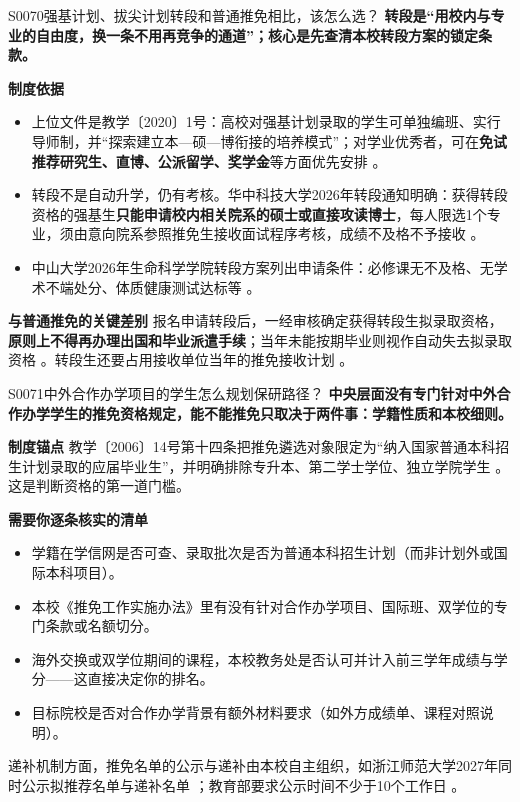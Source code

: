 \begin{qa}{S0070}{强基计划、拔尖计划转段和普通推免相比，该怎么选？}
\textbf{转段是“用校内与专业的自由度，换一条不用再竞争的通道”；核心是先查清本校转段方案的锁定条款。}

\textbf{制度依据}
\begin{itemize}
  \item 上位文件是教学〔2020〕1号：高校对强基计划录取的学生可单独编班、实行导师制，并“探索建立本—硕—博衔接的培养模式”；对学业优秀者，可在\textbf{免试推荐研究生、直博、公派留学、奖学金}等方面优先安排 。
  \item 转段不是自动升学，仍有考核。华中科技大学2026年转段通知明确：获得转段资格的强基生\textbf{只能申请校内相关院系的硕士或直接攻读博士}，每人限选1个专业，须由意向院系参照推免生接收面试程序考核，成绩不及格不予接收 。
  \item 中山大学2026年生命科学学院转段方案列出申请条件：必修课无不及格、无学术不端处分、体质健康测试达标等 。
\end{itemize}

\textbf{与普通推免的关键差别}
报名申请转段后，一经审核确定获得转段生拟录取资格，\textbf{原则上不得再办理出国和毕业派遣手续}；当年未能按期毕业则视作自动失去拟录取资格 。转段生还要占用接收单位当年的推免接收计划 。
\end{qa}

\begin{qa}{S0071}{中外合作办学项目的学生怎么规划保研路径？}
\textbf{中央层面没有专门针对中外合作办学学生的推免资格规定，能不能推免只取决于两件事：学籍性质和本校细则。}

\textbf{制度锚点}
教学〔2006〕14号第十四条把推免遴选对象限定为“纳入国家普通本科招生计划录取的应届毕业生”，并明确排除专升本、第二学士学位、独立学院学生 。这是判断资格的第一道门槛。

\textbf{需要你逐条核实的清单}
\begin{itemize}
  \item 学籍在学信网是否可查、录取批次是否为普通本科招生计划（而非计划外或国际本科项目）。
  \item 本校《推免工作实施办法》里有没有针对合作办学项目、国际班、双学位的专门条款或名额切分。
  \item 海外交换或双学位期间的课程，本校教务处是否认可并计入前三学年成绩与学分——这直接决定你的排名。
  \item 目标院校是否对合作办学背景有额外材料要求（如外方成绩单、课程对照说明）。
\end{itemize}

递补机制方面，推免名单的公示与递补由本校自主组织，如浙江师范大学2027年同时公示拟推荐名单与递补名单 ；教育部要求公示时间不少于10个工作日 。
\end{qa}

